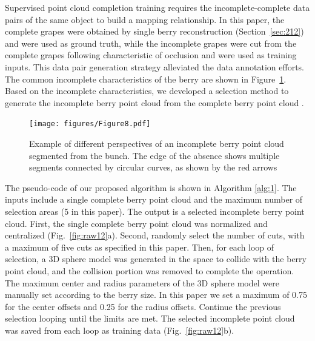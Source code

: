 \documentclass[12pt]{article}
\begin{document}
Supervised point cloud completion training requires the incomplete-complete data pairs of the same object to build a mapping relationship. 
In this paper, the complete grapes were obtained by single berry reconstruction (Section~\ref{sec:212}) and were used as ground truth, while the incomplete grapes were cut from the complete grapes following characteristic of occlusion and were used as training inputs. 
This data pair generation strategy alleviated the data annotation efforts. The common incomplete characteristics of the berry are shown in Figure~\ref{fig:raw4}.
Based on the incomplete characteristics, we developed a selection method to generate the incomplete berry point cloud from the complete berry point cloud .

\begin{figure}[hbt!]
    \centering
    \texttt{[image: figures/Figure8.pdf]}
    \caption{Example of different perspectives of an incomplete berry point cloud segmented from the bunch. The edge of the absence shows multiple segments connected by circular curves, as shown by the red arrows}
    \label{fig:raw4}
\end{figure}

The pseudo-code of our proposed algorithm is shown in Algorithm \ref{alg:1}. 
The inputs include a single complete berry point cloud and the maximum number of selection areas (5 in this paper). 
The output is a selected incomplete berry point cloud. First, the single complete berry point cloud was normalized and centralized (Fig.~\ref{fig:raw12}a). 
Second, randomly select the number of cuts, with a maximum of five cuts as specified in this paper. 
Then, for each loop of selection, a 3D sphere model was generated in the space to collide with the berry point cloud, and the collision portion was removed to complete the operation. 
The maximum center and radius parameters of the 3D sphere model were manually set according to the berry size. 
In this paper we set a maximum of 0.75 for the center offsets and 0.25 for the radius offsets. 
Continue the previous selection looping until the limits are met. The selected incomplete point cloud was saved from each loop as training data (Fig.~\ref{fig:raw12}b). 
\end{document}
